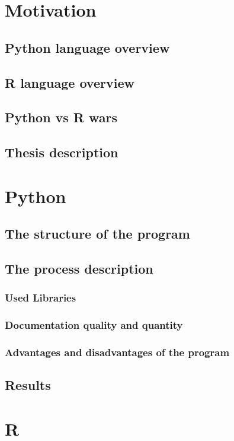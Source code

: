 \documentclass{article}
\begin{document}
\newpage
\section{Motivation}
\subsection{Python language overview}
\subsection{R language overview}
\subsection{Python vs R wars}
\subsection{Thesis description}

\newpage
\section{Python}
\subsection{The structure of the program}
\subsection{The process description}
\subsubsection{Used Libraries}
\subsubsection{Documentation quality and quantity}
\subsubsection{Advantages and disadvantages of the program}
\subsection{Results}

\newpage
\section{R}
\end{document}
